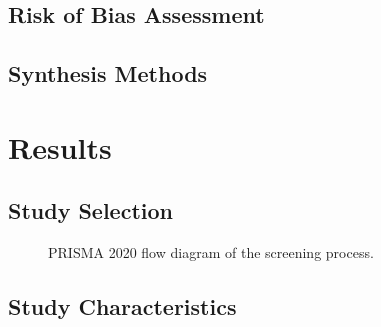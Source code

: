 
\subsection{Risk of Bias Assessment}\label{sec:rob}


\subsection{Synthesis Methods}\label{sec:synthesis-methods}


\section{Results}\label{sec:results}


\subsection{Study Selection}\label{sec:study-selection}


\begin{figure}[htbp]
\centering

\caption{PRISMA 2020 flow diagram of the screening process.}
\label{fig:prisma-flow}
\end{figure}

\subsection{Study Characteristics}\label{sec:study-characteristics}

